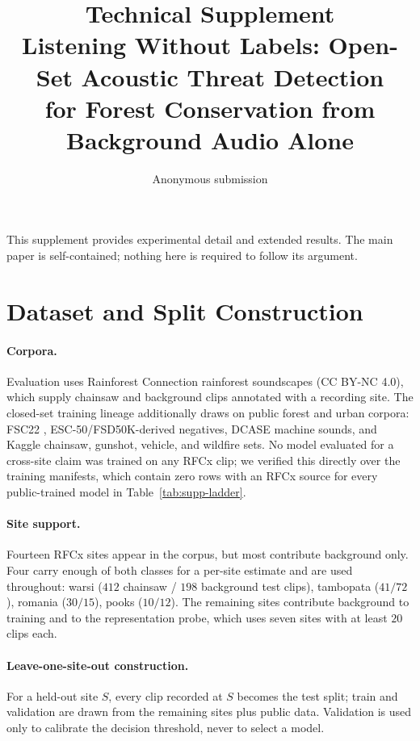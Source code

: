 \documentclass[letterpaper]{article}
\title{Technical Supplement\\
Listening Without Labels: Open-Set Acoustic Threat Detection\\
for Forest Conservation from Background Audio Alone}
\author{Anonymous submission}
\begin{document}
\maketitle

\noindent This supplement provides experimental detail and extended results. The
main paper is self-contained; nothing here is required to follow its argument.

\section{Dataset and Split Construction}

\paragraph{Corpora.} Evaluation uses Rainforest Connection rainforest soundscapes
(CC BY-NC 4.0), which supply chainsaw and background clips annotated with a
recording site. The closed-set training lineage additionally draws on public
forest and urban corpora: FSC22 \citep{bandara2023fsc22}, ESC-50/FSD50K-derived
negatives, DCASE machine sounds, and Kaggle chainsaw, gunshot, vehicle, and
wildfire sets. No model evaluated for a cross-site claim was trained on any RFCx
clip; we verified this directly over the training manifests, which contain zero
rows with an RFCx source for every public-trained model in
Table~\ref{tab:supp-ladder}.

\paragraph{Site support.} Fourteen RFCx sites appear in the corpus, but most
contribute background only. Four carry enough of both classes for a per-site
estimate and are used throughout: warsi ($412$ chainsaw / $198$ background test
clips), tambopata ($41/72$), romania ($30/15$), pooks ($10/12$). The remaining
sites contribute background to training and to the representation probe, which
uses seven sites with at least $20$ clips each.

\paragraph{Leave-one-site-out construction.} For a held-out site $S$, every clip
recorded at $S$ becomes the test split; train and validation are drawn from the
remaining sites plus public data. Validation is used only to calibrate the
decision threshold, never to select a model.
\end{document}
